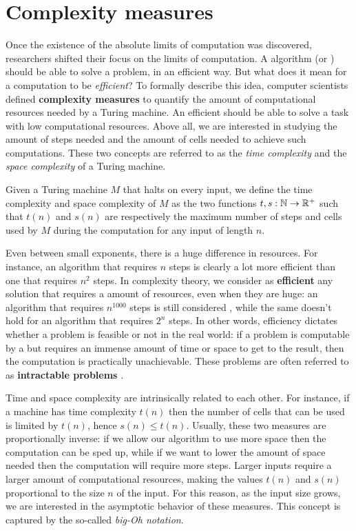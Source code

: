 \section{Complexity measures}

Once the existence of the absolute limits of computation was discovered, researchers shifted their focus on the  limits of computation. A  algorithm (or \TM) should be able to solve a problem, in an efficient way. But what does it mean for a computation to be \textit{efficient}? To formally describe this idea, computer scientists defined \textbf{complexity measures} to quantify the amount of computational resources needed by a Turing machine. An efficient \TM should be able to solve a task with low computational resources. Above all, we are interested in studying the amount of steps needed and the amount of cells needed to achieve such computations. These two concepts are referred to as the \textit{time complexity} and the \textit{space complexity} of a Turing machine.

\begin{definition}
 Given a Turing machine $M$ that halts on every input, we define the time complexity and space complexity of $M$ as the two functions $t, s : \mathbb{N} \to \mathbb{R}^+$ such that $t(n)$ and $s(n)$ are respectively the maximum number of steps and cells used by $M$ during the computation for any input of length $n$.
\end{definition}

Even between small exponents, there is a huge difference in resources. For instance, an algorithm that requires $n$ steps is clearly a lot more efficient than one that requires $n^2$ steps. In complexity theory, we consider as \textbf{efficient} any solution that requires a  amount of resources, even when they are huge: an algorithm that requires $n^{1000}$ steps is still considered , while the same doesn't hold for an algorithm that requires $2^n$ steps. In other words, efficiency dictates whether a problem is feasible or not in the real world: if a problem is computable by a \TM but requires an immense amount of time or space to get to the result, then the computation is practically unachievable. These problems are often referred to as \textbf{intractable problems} \cite{complexity_arora_barak,sipser_computation}.

Time and space complexity are intrinsically related to each other. For instance, if a machine has time complexity $t(n)$ then the number of cells that can be used is limited by $t(n)$, hence $s(n) \leq t(n)$. Usually, these two measures are proportionally inverse: if we allow our algorithm to use more space then the computation can be sped up, while if we want to lower the amount of space needed then the computation will require more steps. Larger inputs require a larger amount of computational resources, making the values $t(n)$ and $s(n)$ proportional to the size $n$ of the input. For this reason, as the input size grows, we are interested in the asymptotic behavior of these measures. This concept is captured by the so-called \textit{big-Oh notation}.

